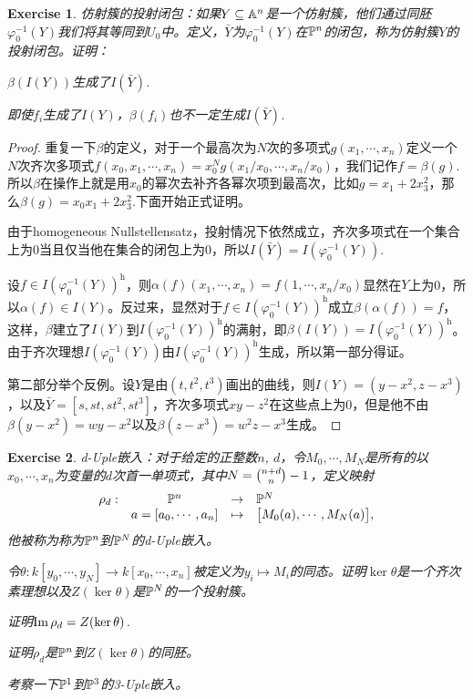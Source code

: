 \documentclass[9pt]{extbook}
\theoremstyle{plain}%
\newtheorem{exe}{Exercise}[section]%
\begin{document}
\setcounter{exe}{8}
\begin{exe}
	仿射簇的投射闭包：如果$Y\subseteq \mathbb{A}^n$是一个仿射簇，他们通过同胚$\varphi_0^{-1}(Y)$我们将其等同到$U_0$中。定义，$\bar{Y}$为$\varphi_0^{-1}(Y)$在$\mathbb{P}^n$的闭包，称为仿射簇$Y$的投射闭包。证明：

	 $\beta(I(Y))$生成了$I(\bar{Y})$.

	 即使$f_i$生成了$I(Y)$，$\beta(f_i)$也不一定生成$I(\bar{Y})$.
\end{exe}
\begin{proof}
	重复一下$\beta$的定义，对于一个最高次为$N$次的多项式$g(x_1,\cdots ,x_n)$定义一个$N$次齐次多项式$f(x_0,x_1,\cdots ,x_n)=x_0^Ng(x_1/x_0,\cdots ,x_n/x_0)$，我们记作$f=\beta(g)$.所以$\beta$在操作上就是用$x_0$的幂次去补齐各幂次项到最高次，比如$g=x_1+2x_3^2$，那么$\beta(g)=x_0x_1+2x_3^2$.下面开始正式证明。

	由于homogeneous Nullstellensatz，投射情况下依然成立，齐次多项式在一个集合上为0当且仅当他在集合的闭包上为0，所以$I(\bar{Y})=I(\varphi_0^{-1}(Y))$.

	设$f\in I(\varphi_0^{-1}(Y))^\mathrm{h}$，则$\alpha(f)(x_1,\cdots,x_n)=f(1,\cdots,x_n/x_0)$显然在$Y$上为0，所以$\alpha(f)\in I(Y)$。反过来，显然对于$f\in I(\varphi_0^{-1}(Y))^\mathrm{h}$成立$\beta(\alpha(f))=f$，这样，$\beta$建立了$I(Y)$到$I(\varphi_0^{-1}(Y))^\mathrm{h}$的满射，即$\beta(I(Y))=I(\varphi_0^{-1}(Y))^\mathrm{h}$。由于齐次理想$I(\varphi_0^{-1}(Y))$由$I(\varphi_0^{-1}(Y))^\mathrm{h}$生成，所以第一部分得证。

	第二部分举个反例。设$Y$是由$(t,t^2,t^3)$画出的曲线，则$I(Y)=(y-x^2,z-x^3)$，以及$\bar{Y}=[s,st,st^2,st^3]$，齐次多项式$xy-z^2$在这些点上为$0$，但是他不由$\beta(y-x^2)=wy-x^2$以及$\beta(z-x^3)=w^2z-x^3$生成。
\end{proof}
\setcounter{exe}{11}
\begin{exe}
	d-Uple嵌入：对于给定的正整数$n$, $d$，令$M_0,\cdots,M_N$是所有的以$x_0,\cdots,x_n$为变量的$d$次首一单项式，其中$N=\tbinom{n+d}{n}-1$，定义映射
	\[
	\begin{array}{lccl}
		\rho_d:&\mathbb{P}^{n}&\to& \mathbb{P}^{N}\\
		&a=[a_0,\cdots ,a_n]&\mapsto&\bigl[M_0(a),\cdots ,M_N(a)\bigr],
	\end{array}
	\]
	他被称为称为$\mathbb{P}^{n}$到$\mathbb{P}^{N}$的d-Uple嵌入。

	 令$\theta:k[y_0,\cdots,y_N]\to k[x_0,\cdots,x_n]$被定义为$y_i\mapsto M_i$的同态。证明$\ker\theta$是一个齐次素理想以及$Z(\ker \theta)$是$\mathbb{P}^{N}$的一个投射簇。

	 证明$\operatorname{Im} \rho_d=Z(\ker \theta)$.
	
	 证明$\rho_d$是$\mathbb{P}^{n}$到$Z(\ker \theta)$的同胚。

	 考察一下$\mathbb{P}^{1}$到$\mathbb{P}^{3}$的3-Uple嵌入。
\end{exe}
\end{document}
